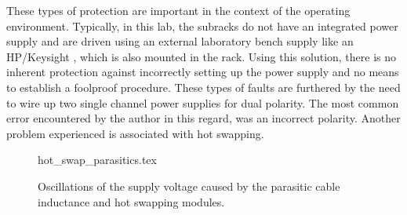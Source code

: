 These types of protection are important in the context of the operating environment. Typically, in this lab, the subracks do not have an integrated power supply and are driven using an external laboratory bench supply like an HP/Keysight  \cite{datasheet_keysight6632B}, which is also mounted in the rack. Using this solution, there is no inherent protection against incorrectly setting up the power supply and no means to establish a foolproof procedure. These types of faults are furthered by the need to wire up two single channel power supplies for dual polarity. The most common error encountered by the author in this regard, was an incorrect polarity. Another problem experienced is associated with hot swapping.
\begin{figure}[ht]
    \centering
    \begin{subcaptionblock}{0.45\linewidth}
        \begin{minipage}[t][4.4cm]{\linewidth}
            \centering
            {hot_swap_parasitics.tex}
        \end{minipage}
        \caption{Power supply input parasitic elements forming an underdamped oscillator.}
        \label{fig:hot_swap_parasitics}
    \end{subcaptionblock}
    \begin{subcaptionblock}{0.45\linewidth}
        \centering
            
        \caption{Simulated connection to a hot \qty{15}{\V} rail. The parameters were $L=\qty{3}{\uH}$, $R=\qty{10}{\milli\ohm}$ and $C=\qty{1}{\uF}$.}
        \label{fig:hot_swap_simulation}
    \end{subcaptionblock}
    \caption{Oscillations of the supply voltage caused by the parasitic cable inductance and hot swapping modules.}
    \label{fig:hot_swap_example}
\end{figure}


